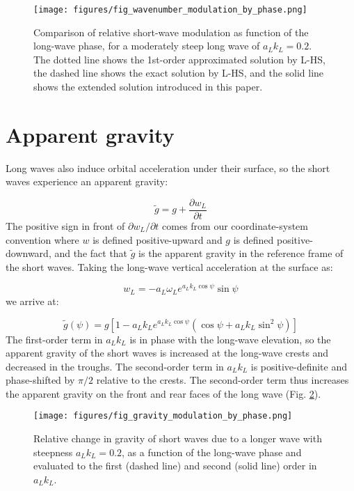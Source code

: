 \documentclass[draft]{agujournal2019}
\begin{document}
\begin{figure}[h]
\label{fig:wavenumber_modulation}
\centering
\texttt{[image: figures/fig\_wavenumber\_modulation\_by\_phase.png]}
\caption{
  Comparison of relative short-wave modulation as function of the
  long-wave phase, for a moderately steep long wave of $a_L k_L = 0.2$.
  The dotted line shows the 1st-order approximated solution by L-HS,
  the dashed line shows the exact solution by L-HS,
  and the solid line shows the extended solution introduced in this paper.
}
\end{figure}

\section{Apparent gravity}

Long waves also induce orbital acceleration under their surface, so the short
waves experience an apparent gravity:

\begin{equation}
\label{eq:apparent_gravity1}
\widetilde{g} = g + \dfrac{\partial w_L}{\partial t}
\end{equation}
The positive sign in front of $\partial w_L/\partial t$ comes from our
coordinate-system convention where $w$ is defined positive-upward and $g$ is
defined positive-downward, and the fact that $\widetilde{g}$ is the apparent
gravity in the reference frame of the short waves.
Taking the long-wave vertical acceleration at the surface as:

\begin{equation}
\label{eq:w_L}
w_L = - a_L \omega_L e^{a_L k_L \cos{\psi}} \sin{\psi}
\end{equation}
we arrive at:

\begin{equation}
\label{eq:apparent_gravity2}
\widetilde{g}(\psi) = g \left[
  1 - a_L k_L e^{a_L k_L \cos{\psi}} \left(
    \cos{\psi} + a_L k_L \sin^2{\psi}
  \right)
\right]
\end{equation}
The first-order term in $a_L k_L$ is in phase with the long-wave elevation,
so the apparent gravity of the short waves is increased at the long-wave crests
and decreased in the troughs.
The second-order term in $a_L k_L$ is positive-definite and phase-shifted by
$\pi/2$ relative to the crests.
The second-order term thus increases the apparent gravity on the front and rear
faces of the long wave (Fig. \ref{fig:apparent_gravity}).

\begin{figure}[h]
\label{fig:apparent_gravity}
\centering
\texttt{[image: figures/fig\_gravity\_modulation\_by\_phase.png]}
\caption{
  Relative change in gravity of short waves due to a longer wave with steepness $a_L k_L = 0.2$,
  as a function of the long-wave phase and evaluated to the first (dashed line) and second (solid line) order in $a_L k_L$.
}
\end{figure}
\end{document}
